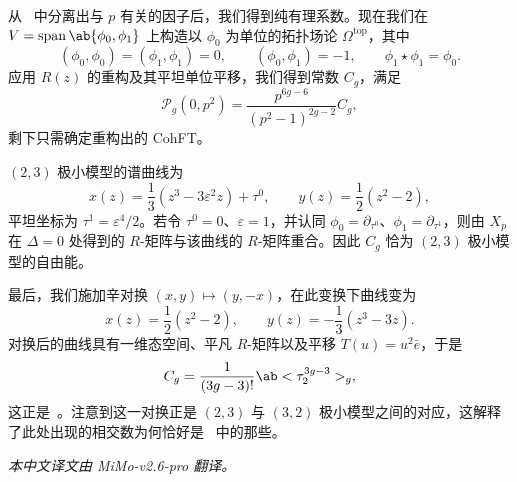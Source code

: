 \documentclass{amsart}
\theoremstyle{definition}
\theoremstyle{remark}
\theoremstyle{plain}
\theoremstyle{definition}
\theoremstyle{remark}
\newcommand{\ep}{\varepsilon}
\newcommand{\mc}[1]{\mathcal{#1}}
\newcommand{\mr}[1]{\mathrm{#1}}
\newcommand{\on}[1]{\operatorname{#1}}
\newcommand{\1}{\mathbf{1}}
\newcommand{\2}{\mathbf{2}}
\newcommand{\3}{\mathbf{3}}
\begin{document}
从~ 中分离出与 \(p\) 有关的因子后，我们得到纯有理系数。现在我们在 \(V = \on{span}\ab\{\phi_0,\phi_1\}\) 上构造以 \(\phi_0\) 为单位的拓扑场论 \(\Omega^{\mr{top}}\)，其中
\[ (\phi_0,\phi_0) = (\phi_1,\phi_1) = 0, \qquad (\phi_0,\phi_1) = -1, \qquad \phi_1 \star \phi_1 = \phi_0. \]
应用 \(R(z)\) 的重构及其平坦单位平移，我们得到常数 \(C_g\)，满足
\[ \mc{P}_g(0,p^2) = \frac{p^{6g-6}}{(p^2-1)^{2g-2}}C_g, \]
剩下只需确定重构出的 CohFT。

\((2,3)\) 极小模型的谱曲线为
\[ x(z) = \frac{1}{3}(z^3-3\ep^2 z) + \tau^0, \qquad y(z) = \frac{1}{2}(z^2-2), \]
平坦坐标为 \(\tau^1 = \ep^4/2\)。若令 \(\tau^0 = 0\)、\(\ep = 1\)，并认同 \(\phi_0 = \partial_{\tau^0}\)、\(\phi_1 = \partial_{\tau^1}\)，则由 \(X_p\) 在 \(\Delta = 0\) 处得到的 \(R\)-矩阵与该曲线的 \(R\)-矩阵重合。因此 \(C_g\) 恰为 \((2,3)\) 极小模型的自由能。

最后，我们施加辛对换 \((x,y) \mapsto (y,-x)\)，在此变换下曲线变为
\[ x(z) = \frac{1}{2}(z^2-2), \qquad y(z) = -\frac{1}{3}(z^3-3z). \]
对换后的曲线具有一维态空间、平凡 \(R\)-矩阵以及平移 \(T(u) = u^2 \bar{e}\)，于是
\[ C_g = \frac{1}{(3g-3)!}\ab<\tau_2^{3g-3}>_g, \]
这正是~。注意到这一对换正是 \((2,3)\) 与 \((3,2)\) 极小模型之间的对应，这解释了此处出现的相交数为何恰好是~ 中的那些。


\bigskip
\noindent\textit{本中文译文由 MiMo-v2.6-pro 翻译。}

\printbibliography
\end{document}
